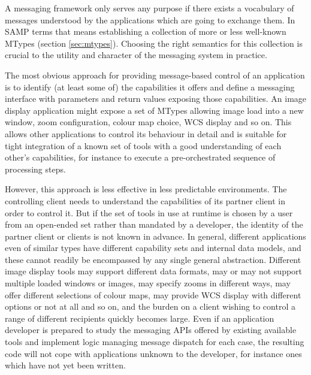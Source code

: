 \documentclass[5p]{elsarticle}
\begin{document}
A messaging framework only serves any purpose if there exists
a vocabulary of messages understood by the
applications which are going to exchange them.
In SAMP terms that means establishing a collection of
more or less well-known MTypes (section \ref{sec:mtypes}).
Choosing the right semantics for this collection is crucial
to the utility and character of the messaging system in practice.

The most obvious approach for providing message-based control
of an application
is to identify (at least some of) the capabilities it offers and
define a messaging interface with parameters and return values
exposing those capabilities.  An image display application might
expose a set of MTypes allowing image load into a new window,
zoom configuration, colour map choice, WCS display and so on.
This allows other applications to control its behaviour
in detail and is suitable for tight integration of a known set
of tools with a good understanding of each other's capabilities,
for instance to execute a pre-orchestrated sequence of processing steps.

However, this approach is less effective in less predictable environments.
The controlling client needs to understand
the capabilities of its partner client in order to control it.
But if the set of tools in use at runtime is chosen by a
user from an open-ended set
rather than mandated by a developer, the identity of the
partner client or clients is not known in advance.
In general, different applications even of similar types
have different capability sets
and internal data models, and these cannot readily be encompassed
by any single general abstraction.
Different image display tools
may support different data formats,
may or may not support multiple loaded windows or images,
may specify zooms in different ways,
may offer different selections of colour maps,
may provide WCS display with different options or not at all
and so on,
and the burden on a client wishing to control a range
of different recipients quickly becomes large.
Even if an application developer is prepared to study the
messaging APIs offered by existing available tools and implement logic
managing message dispatch for each case,
the resulting code will not cope with applications
unknown to the developer,
for instance ones which have not yet been written.
\end{document}
